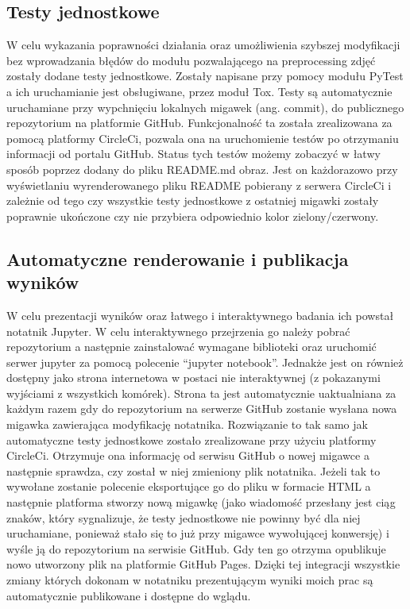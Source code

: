 \documentclass{article}
\begin{document}
\subsection{Testy jednostkowe}
W celu wykazania poprawności działania oraz umożliwienia szybszej modyfikacji bez wprowadzania błędów do modułu pozwalającego na preprocessing zdjęć zostały dodane testy jednostkowe.
Zostały napisane przy pomocy modułu PyTest a ich uruchamianie jest obsługiwane, przez moduł Tox.
Testy są automatycznie uruchamiane przy wypchnięciu lokalnych migawek (ang. commit), do publicznego repozytorium na platformie GitHub.
Funkcjonalność ta została zrealizowana za pomocą platformy CircleCi, pozwala ona na uruchomienie testów po otrzymaniu informacji od portalu GitHub.
Status tych testów możemy zobaczyć w łatwy sposób poprzez dodany do pliku README.md obraz.
Jest on każdorazowo przy wyświetlaniu wyrenderowanego pliku README pobierany z serwera CircleCi i zależnie od tego czy wszystkie testy jednostkowe z ostatniej migawki zostały poprawnie ukończone czy nie przybiera odpowiednio kolor zielony/czerwony.
\subsection{Automatyczne renderowanie i publikacja wyników}
W celu prezentacji wyników oraz łatwego i interaktywnego badania ich powstał notatnik Jupyter.
W celu interaktywnego przejrzenia go należy pobrać repozytorium a następnie zainstalować wymagane biblioteki oraz uruchomić serwer jupyter za pomocą polecenie ``jupyter notebook''.
Jednakże jest on również dostępny jako strona internetowa w postaci nie interaktywnej (z pokazanymi wyjściami z wszystkich komórek).
Strona ta jest automatycznie uaktualniana za każdym razem gdy do repozytorium na serwerze GitHub zostanie wysłana nowa migawka zawierająca modyfikację notatnika.
Rozwiązanie to tak samo jak automatyczne testy jednostkowe zostało zrealizowane przy użyciu platformy CircleCi.
Otrzymuje ona informację od serwisu GitHub o nowej migawce a następnie sprawdza, czy został w niej zmieniony plik notatnika.
Jeżeli tak to wywołane zostanie polecenie eksportujące go do pliku w formacie HTML a następnie platforma stworzy nową migawkę (jako wiadomość przesłany jest ciąg znaków, który sygnalizuje, że testy jednostkowe nie powinny być dla niej uruchamiane, ponieważ stało się to już przy migawce wywołującej konwersję) i wyśle ją do repozytorium na serwisie GitHub.
Gdy ten go otrzyma opublikuje nowo utworzony plik na platformie GitHub Pages.
Dzięki tej integracji wszystkie zmiany których dokonam w notatniku prezentującym wyniki moich prac są automatycznie publikowane i dostępne do wglądu.
\end{document}
